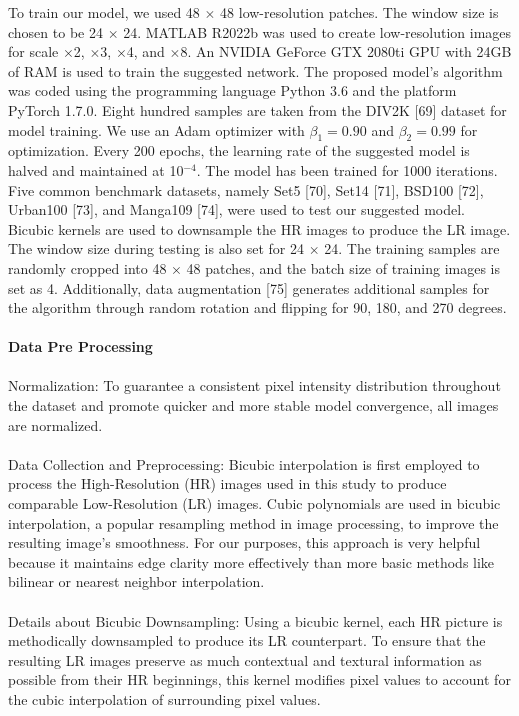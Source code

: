 \documentclass[twocolumn]{svjour3}          %
\begin{document}
To train our model, we used 48 $\times$ 48 low-resolution patches. The window size is chosen to be 24 $\times$ 24. MATLAB R2022b was used to create low-resolution images for scale $\times$2, $\times$3, $\times$4, and $\times$8. An NVIDIA GeForce GTX 2080ti GPU with 24GB of RAM is used to train the suggested network. The proposed model's algorithm was coded using the programming language Python 3.6 and the platform PyTorch 1.7.0. Eight hundred samples are taken from the DIV2K [69] dataset for model training. We use an Adam optimizer with $\beta_1 = 0.90$ and $\beta_2 = 0.99$ for optimization. Every 200 epochs, the learning rate of the suggested model is halved and maintained at 10$^{-4}$. The model has been trained for 1000 iterations.
Five common benchmark datasets, namely Set5 [70], Set14 [71], BSD100 [72], Urban100 [73], and Manga109 [74], were used to test our suggested model. Bicubic kernels are used to downsample the HR images to produce the LR image. The window size during testing is also set for 24 $\times$ 24. The training samples are randomly cropped into 48 $\times$ 48 patches, and the batch size of training images is set as 4. Additionally, data augmentation [75] generates additional samples for the algorithm through random rotation and flipping for 90, 180, and 270 degrees.\\
\\
\textbf{Data Pre Processing}\\
\\
Normalization: To guarantee a consistent pixel intensity distribution throughout the dataset and promote quicker and more stable model convergence, all images are normalized.\\
\\
Data Collection and Preprocessing: Bicubic interpolation is first employed to process the High-Resolution (HR) images used in this study to produce comparable Low-Resolution (LR) images. Cubic polynomials are used in bicubic interpolation, a popular resampling method in image processing, to improve the resulting image's smoothness. For our purposes, this approach is very helpful because it maintains edge clarity more effectively than more basic methods like bilinear or nearest neighbor interpolation.\\
\\
Details about Bicubic Downsampling: Using a bicubic kernel, each HR picture is methodically downsampled to produce its LR counterpart. To ensure that the resulting LR images preserve as much contextual and textural information as possible from their HR beginnings, this kernel modifies pixel values to account for the cubic interpolation of surrounding pixel values.\\
\end{document}
